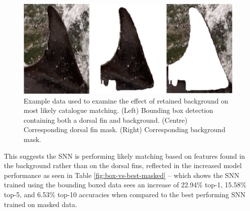 \begin{figure}
	\begin{center}
		\includegraphics[scale=0.5]{Chapter6/figs/embedding-check-images.jpg}
	\end{center}
	\caption[Example data used to examine the effect of retained background on most likely catalogue matching.]{Example data used to examine the effect of retained background on most likely catalogue matching. (Left) Bounding box detection containing both a dorsal fin and background. (Centre) Corresponding dorsal fin mask. (Right) Corresponding background mask.}
	\label{fig:bboxvsmask}
\end{figure}

This suggests the SNN is performing likely matching based on features found in the background rather than on the dorsal fins, reflected in the increased model performance as seen in Table \ref{fig:box-vs-best-masked} -- which shows the SNN trained using the bounding boxed data sees an increase of 22.94\% top-1, 15.58\% top-5, and 6.53\% top-10 accuracies when compared to the best performing SNN trained on masked data.

